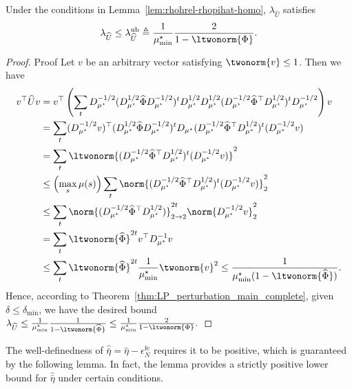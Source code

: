 \documentclass[mnsc,nonblindrev]{informs3}
\newcommand{\ubluhat}{\lambda^{\mathrm{ub}}_{\widehat{U}}}
\newcommand{\phihat}{\widehat{\Phi}}
\newcommand{\uhat}{\widehat{U}}
\newcommand{\enfe}{\epsilon_N^{\mathrm{fe}}}
\begin{document}
\begin{APPENDICES}
\begin{lemma}\label{lem:lamda-Uhat-upper-bound}
Under the conditions in Lemma~\ref{lem:rhohrel-rhopihat-homo},
$\lambda_{\widehat U}$ satisfies
     \begin{equation}\label{def:ubluhat}
         \lambda_{\widehat U}\le \ubluhat\triangleq\frac{1}{\mu^\star_{\min}}\frac{2}{1-\ltwonorm{\Phi}}.
     \end{equation}
\end{lemma}
\begin{proof}{Proof}
     Let $v$ be an arbitrary vector satisfying $\twonorm{v} \leq 1$. Then we have
\begin{align*}
    v^\top \uhat v 
    &= v^\top  \left(\sum_t D_{\mu^\star}^{-1/2} (D_{\mu^\star}^{1/2} \phihat D_{\mu^\star}^{-1/2} )^t D_{\mu^\star}^{1/2} D_{\mu^\star}^{1/2} ( D_{\mu^\star}^{-1/2} \phihat^\top D_{\mu^\star}^{1/2})^t D_{\mu^\star}^{-1/2} \right) v \\
    &= \sum_t (D_{\mu^\star}^{-1/2}v)^\top  (D_{\mu^\star}^{1/2} \phihat D_{\mu^\star}^{-1/2} )^t D_{\mu^\star} ( D_{\mu^\star}^{-1/2} \phihat^\top D_{\mu^\star}^{1/2})^t (D_{\mu^\star}^{-1/2}v) \\
    & = \sum_t \ltwonorm{( D_{\mu^\star}^{-1/2} \phihat^\top D_{\mu^\star}^{1/2})^t (D_{\mu^\star}^{-1/2}v)}^2\\
    & \leq \left(\max_s \mu(s)\right)\sum_t \norm{( D_{\mu^\star}^{-1/2} \phihat^\top D_{\mu^\star}^{1/2})^t (D_{\mu^\star}^{-1/2}v)}_{2}^2\\
    & \leq \sum_t \norm{( D_{\mu^\star}^{-1/2} \phihat^\top D_{\mu^\star}^{1/2})}_{2 \to 2}^{2t} \norm{D_{\mu^\star}^{-1/2}v}_{2}^2\\
    & =\sum_t \ltwonorm{\phihat}^{2t} v^\top D_{\mu^\star}^{-1} v\\
    & \leq \sum_t \ltwonorm{\phihat}^{2t} \frac{1}{\mu^\star_{\min}} \twonorm{v}^2 
    \le \frac{1}{\mu^\star_{\min}(1-\ltwonorm{\phihat})}.
\end{align*}
Hence, according to Theorem~\ref{thm:LP_perturbation_main_complete}, given $\delta\le\delta_{\min}$, we have the desired bound
    $
        \lambda_{\widehat U}\le \frac{1}{\mu^\star_{\min}}\frac{1}{1-\ltwonorm{\phihat}}\le\frac{1}{\mu^\star_{\min}}\frac{2}{1-\ltwonorm{\Phi}}.
    $
\end{proof}

The well-definedness of $\widehat{\bar\eta}=\widehat \eta-\enfe$ requires it to be positive, which is guaranteed by the following lemma. In fact, the lemma provides a strictly positive lower bound for $\widehat{\bar\eta}$ under certain conditions.


\end{APPENDICES}
\end{document}
